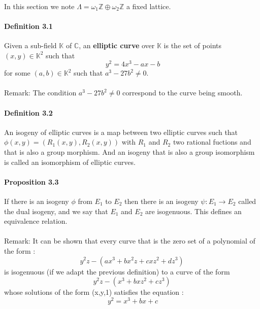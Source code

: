 \documentclass[letterpaper,10pt]{article}
\begin{document}
\paragraph{} In this section we note $\Lambda = \omega_1\mathbb{Z} \oplus \omega_2\mathbb{Z}$ a fixed lattice.

\paragraph{Definition 3.1} Given a sub-field $\mathbb{K}$ of $\mathbb{C}$, an \textbf{elliptic curve} over $\mathbb{K}$ is the set of points $(x,y) \in \mathbb{K}^2$ such that 
\[\ y^2 = 4x^3 - ax - b \] for some $(a,b) \in \mathbb{K}^2$ such that $a^3-27b^2 \neq 0$.
{\itshape \paragraph{} Remark: The condition $a^3-27b^2 \neq 0$ correspond to the curve being smooth.
}

\paragraph{Definition 3.2} An isogeny of elliptic curves is a map  between two elliptic curves such that $ \phi(x,y) = (R_1(x,y),R_2(x,y))$ 
with $R_1$ and $R_2$ two rational fuctions and that is also a group morphism. And an isogeny that is also a group isomorphism is called an isomorphism of
elliptic curves.

\paragraph{Proposition 3.3} If there is an isogeny $\phi$ from $E_1$ to $E_2$ then there is an isogeny
$\psi : E_1 \to E_2$ called the dual isogeny, and we say that $E_1$ and $E_2$ are isogenuous.
This defines an equivalence relation.

{\itshape \paragraph{}Remark: It can be shown that every curve that is the zero set of a polynomial of the form : 
\[ y^2z - (ax^3+bx^2z+ cxz^2 + dz^3)\]
is isogenuous (if we adapt the previous definition) to a curve of the form \[ y^2z - (x^3+bxz^2 + cz^3)\]
whose solutions of the form (x,y,1) satisfies the equation : \[\ y^2 = x^3 + bx + c \]

}
\end{document}
